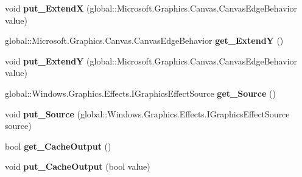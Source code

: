 \begin{DoxyCompactItemize}
\item 
\mbox{\label{class_microsoft_1_1_graphics_1_1_canvas_1_1_effects_1_1_border_effect_af4f6600839db25402d0fb39ed1fd5542}} 
void {\bfseries put\+\_\+\+ExtendX} (global\+::\+Microsoft.\+Graphics.\+Canvas.\+Canvas\+Edge\+Behavior value)
\item 
\mbox{\label{class_microsoft_1_1_graphics_1_1_canvas_1_1_effects_1_1_border_effect_aa62a4c26a2f87c325e90e8a2ef7348d0}} 
global\+::\+Microsoft.\+Graphics.\+Canvas.\+Canvas\+Edge\+Behavior {\bfseries get\+\_\+\+ExtendY} ()
\item 
\mbox{\label{class_microsoft_1_1_graphics_1_1_canvas_1_1_effects_1_1_border_effect_aaae1874ec7b1b2630d7636442f2c79c0}} 
void {\bfseries put\+\_\+\+ExtendY} (global\+::\+Microsoft.\+Graphics.\+Canvas.\+Canvas\+Edge\+Behavior value)
\item 
\mbox{\label{class_microsoft_1_1_graphics_1_1_canvas_1_1_effects_1_1_border_effect_ad3238a486519b9e346560be58abbd303}} 
global\+::\+Windows.\+Graphics.\+Effects.\+I\+Graphics\+Effect\+Source {\bfseries get\+\_\+\+Source} ()
\item 
\mbox{\label{class_microsoft_1_1_graphics_1_1_canvas_1_1_effects_1_1_border_effect_aff45744a28e3679714ecb278ca56bffc}} 
void {\bfseries put\+\_\+\+Source} (global\+::\+Windows.\+Graphics.\+Effects.\+I\+Graphics\+Effect\+Source source)
\item 
\mbox{\label{class_microsoft_1_1_graphics_1_1_canvas_1_1_effects_1_1_border_effect_a301b900c39be029d992cd9fa734be8f5}} 
bool {\bfseries get\+\_\+\+Cache\+Output} ()
\item 
\mbox{\label{class_microsoft_1_1_graphics_1_1_canvas_1_1_effects_1_1_border_effect_a4d808949ea25fb186b222dacfafb5f3d}} 
void {\bfseries put\+\_\+\+Cache\+Output} (bool value)

\end{DoxyCompactItemize}
